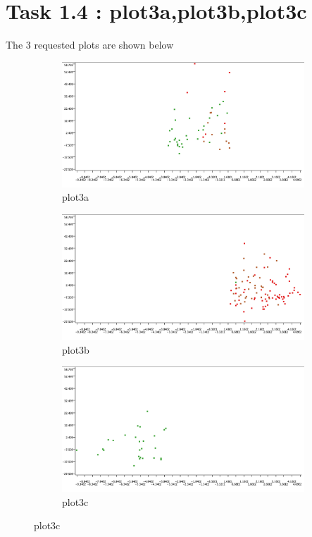 \documentclass[12pt]{article}
\begin{document}
	 \section*{Task 1.4 : plot3a,plot3b,plot3c}
		The 3 requested plots are shown below
		 \begin{figure}[H]
		 	\centering
		 	\begin{subfigure}{0.4\textwidth}
		 		\includegraphics[width=\textwidth]{res/plot3a}
		 		\caption{plot3a}
		 		\label{fig:first}
		 	\end{subfigure}
		 	\hfill
		 	\begin{subfigure}{0.4\textwidth}
		 		\includegraphics[width=\textwidth]{res/plot3b}
		 		\caption{plot3b}
		 		\label{fig:second}
		 	\end{subfigure}
		 	\hfill
		 	\begin{subfigure}{0.4\textwidth}
		 		\includegraphics[width=\textwidth]{res/plot3c}
		 		\caption{plot3c}
		 		\label{fig:third}
		 	\end{subfigure}
		 	
		 	\label{fig:figures}
		 \end{figure}
\end{document}
